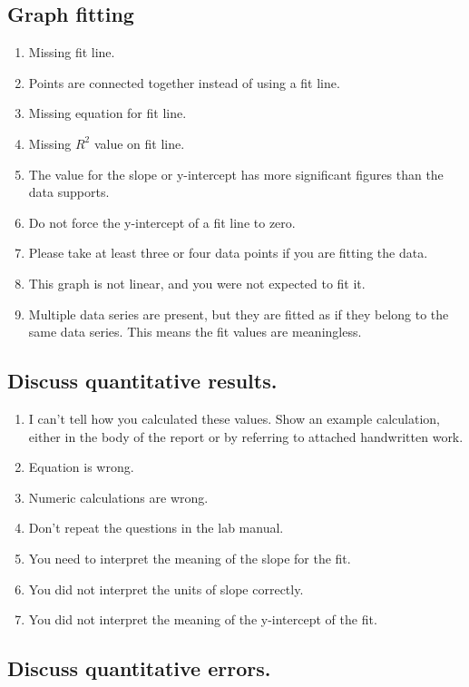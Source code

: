 \documentclass[10pt,letterpaper]{article}
\begin{document}
\begin{multicols}{2}
\subsection*{Graph fitting}

\begin{enumerate}[start=110]
  \item Missing fit line.
  \item Points are connected together instead of using a fit line.
  \item Missing equation for fit line.
  \item Missing $R^2$ value on fit line.
  \item The value for the slope or y-intercept
    has more significant figures than the data supports.
  \item Do not force the y-intercept of a fit line to zero.
  \item Please take at least three or four data points
    if you are fitting the data.
  \item This graph is not linear,
    and you were not expected to fit it.
  \item Multiple data series are present,
    but they are fitted as if they belong to the same data series.
    This means the fit values are meaningless.
\end{enumerate}

\subsection*{Discuss quantitative results.}

\begin{enumerate}[start=120]
  \item I can't tell how you calculated these values.
    Show an example calculation, either in the body of the report
    or by referring to attached handwritten work.
  \item Equation is wrong.
  \item Numeric calculations are wrong.
  \item Don't repeat the questions in the lab manual.
  \item You need to interpret the meaning of the slope for the fit.
  \item You did not interpret the units of slope correctly.
  \item You did not interpret the meaning of the y-intercept of the fit.
\end{enumerate}

\subsection*{Discuss quantitative errors.}


\end{multicols}
\end{document}
